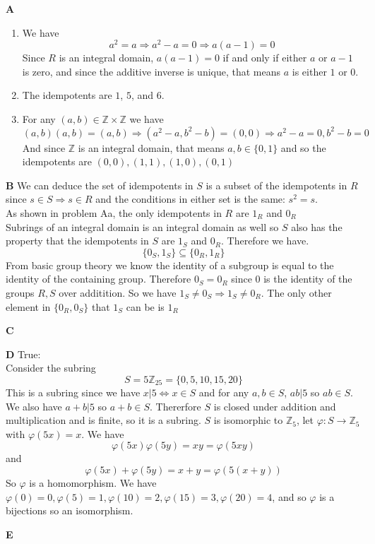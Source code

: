 \documentclass[12pt]{article}
\newenvironment{ques}{\vspace{2 ex}}{\vspace{2 ex}}
\theoremstyle{definition}
\begin{document}
\begin{ques}
	\textbf{A}
	\begin{enumerate}
		\item
		We have
		$$a^2 = a \Rightarrow a^2 - a = 0 \Rightarrow a(a - 1) = 0$$
		Since $R$ is an integral domain, $a(a-1) = 0$ if and only if
		either $a$ or $a-1$ is zero, and since the additive inverse is
		unique, that means $a$ is either $1$ or $0$.
		\item
		The idempotents are $1$, $5$, and $6$.
		\item
		For any $(a,b) \in
		\mathbb Z \times \mathbb Z$ we have 
		$$(a, b)(a, b) = (a, b) \Rightarrow (a^2 - a, b^2 - b) = (0,0)
		\Rightarrow a^2 - a =0, b^2 - b = 0$$
		And since $\mathbb Z$ is an integral domain, that means $a,b
		\in \{0, 1\}$ and so the idempotents are $(0,0), (1,1), (1,0),
		(0,1)$
	\end{enumerate}
\end{ques}

\begin{ques}
	\textbf{B}
	We can deduce the set of idempotents in $S$ is a subset of
	the idempotents in $R$ since $s \in S \Rightarrow s \in R$ and the
	conditions in either set is the same: $s^2 = s$.\\
	As shown in problem Aa, the only idempotents in $R$ are $1_R$ and $0_R$\\
	Subrings of an integral domain is an integral domain as well so $S$
	also has the property that the idempotents in $S$ are $1_S$ and $0_R$.
	Therefore we have.
	$$\{0_S, 1_S\} \subseteq \{0_R, 1_R\}$$
	From basic group theory we know the identity of a subgroup is equal to
	the identity of the containing group. Therefore $0_S = 0_R$ since $0$
	is the identity of the groups $R, S$ over additition. So we have $1_S
	\neq 0_S \Rightarrow 1_S \neq 0_R$. The only other element in $\{0_R,
	0_S\}$ that $1_S$ can be is $1_R$
\end{ques}

\begin{ques}
	\textbf{C}
	
\end{ques}

\begin{ques}
	\textbf{D}
	True:\\
	Consider the subring
	$$S = 5\mathbb Z _{25} = \{0, 5, 10, 15, 20\}$$
	This is a subring since we have $x|5 \Leftrightarrow x \in S$ and for
	any $a, b \in S$, $ab | 5$ so $ab \in S$. We also have $a + b |5$ so $a
	+b \in S$. Thererfore $S$ is closed under addition and multiplication
	and is finite, so it is a subring. $S$ is isomorphic to $\mathbb Z _5$,
	let $\varphi: S \to \mathbb Z_5$ with $\varphi(5x) = x$. We have
	$$\varphi(5x)\varphi(5y) = xy = \varphi(5xy)$$
	and
	$$\varphi(5x) + \varphi(5y) = x + y = \varphi(5(x + y))$$
	So $\varphi$ is a homomorphism. We have $\varphi(0) = 0, \varphi(5) =
	1, \varphi(10) = 2, \varphi(15) = 3, \varphi(20) = 4$, and so $\varphi$
	is a bijections so an isomorphism.
\end{ques}

\begin{ques}
	\textbf{E}
\end{ques}
\end{document}
